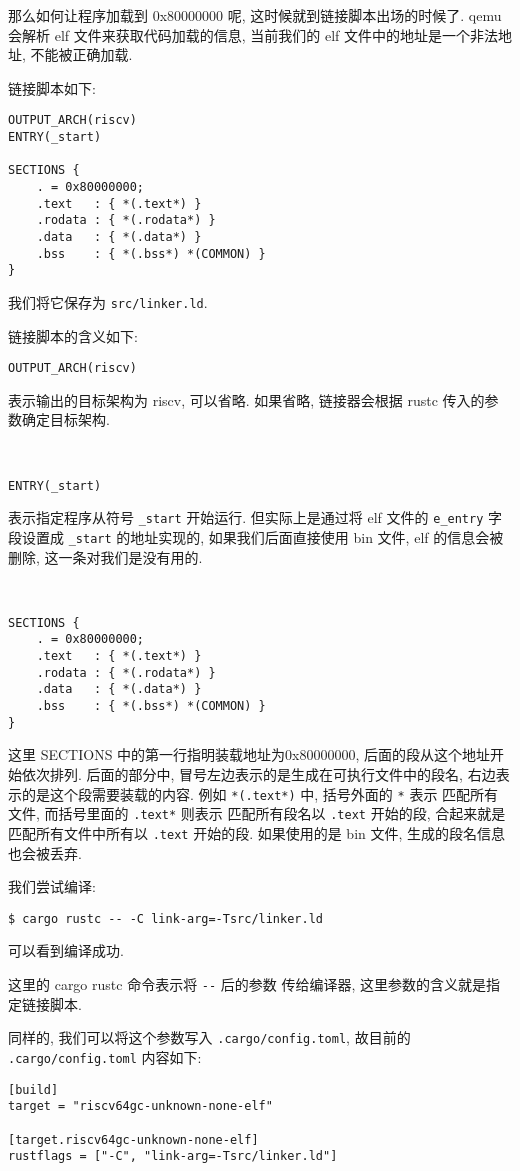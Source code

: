 \documentclass[a4paper]{ctexart}
\begin{document}
那么如何让程序加载到 0x80000000 呢,
这时候就到链接脚本出场的时候了.
qemu 会解析 elf 文件来获取代码加载的信息,
当前我们的 elf 文件中的地址是一个非法地址,
不能被正确加载.

链接脚本如下:
\begin{lstlisting}
OUTPUT_ARCH(riscv)
ENTRY(_start)

SECTIONS {
    . = 0x80000000;
    .text   : { *(.text*) }
    .rodata : { *(.rodata*) }
    .data   : { *(.data*) }
    .bss    : { *(.bss*) *(COMMON) }
}
\end{lstlisting}
我们将它保存为 \verb|src/linker.ld|.

链接脚本的含义如下:
\begin{lstlisting}
OUTPUT_ARCH(riscv)
\end{lstlisting}
表示输出的目标架构为 riscv, 可以省略.
如果省略, 链接器会根据 rustc 传入的参数确定目标架构.

\

\begin{lstlisting}
ENTRY(_start)
\end{lstlisting}
表示指定程序从符号 \verb|_start| 开始运行.
但实际上是通过将 elf 文件的 \verb|e_entry| 字段设置成
\verb|_start| 的地址实现的,
如果我们后面直接使用 bin 文件,
elf 的信息会被删除,
这一条对我们是没有用的.

\

\begin{lstlisting}
SECTIONS {
    . = 0x80000000;
    .text   : { *(.text*) }
    .rodata : { *(.rodata*) }
    .data   : { *(.data*) }
    .bss    : { *(.bss*) *(COMMON) }
}
\end{lstlisting}
这里 SECTIONS 中的第一行指明装载地址为0x80000000,
后面的段从这个地址开始依次排列.
后面的部分中, 冒号左边表示的是生成在可执行文件中的段名,
右边表示的是这个段需要装载的内容.
例如 \verb|*(.text*)| 中, 括号外面的 \verb|*| 表示
匹配所有文件, 而括号里面的 \verb|.text*| 则表示
匹配所有段名以 \verb|.text| 开始的段,
合起来就是匹配所有文件中所有以 \verb|.text| 开始的段.
如果使用的是 bin 文件, 生成的段名信息也会被丢弃.

我们尝试编译:
\begin{lstlisting}
$ cargo rustc -- -C link-arg=-Tsrc/linker.ld
\end{lstlisting}
可以看到编译成功.

这里的 cargo rustc 命令表示将 \verb|--| 后的参数
传给编译器, 这里参数的含义就是指定链接脚本.

同样的, 我们可以将这个参数写入 \verb|.cargo/config.toml|,
故目前的 \verb|.cargo/config.toml| 内容如下:
\begin{lstlisting}
[build]
target = "riscv64gc-unknown-none-elf"

[target.riscv64gc-unknown-none-elf]
rustflags = ["-C", "link-arg=-Tsrc/linker.ld"]
\end{lstlisting}
\end{document}
